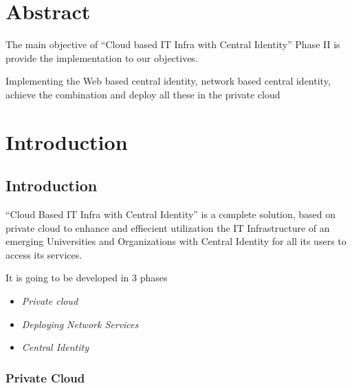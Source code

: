 \documentclass[12pt]{report}
\begin{document}
 
\chapter*{Abstract}
\setcounter{page}{1}
\normalsize
\hspace{0.5cm} The main objective of ``Cloud based IT Infra with Central Identity'' Phase II is provide the implementation to our objectives. \newline

Implementing the Web based central identity, network based central identity, achieve the combination and deploy all these in the private cloud \newline


\setcounter{page}{2}
\tableofcontents
\listoffigures
\pagebreak \thispagestyle{empty} \pagebreak

 
\setcounter{page}{1}


\chapter{Introduction}

\section{Introduction}
	``Cloud Based IT Infra with Central Identity'' is a complete solution, based on private cloud to enhance and effiecient utilization the IT Infrastructure of an emerging Universities and Organizations with Central Identity for all its users to access its services.\newline

	It is going to be developed in 3 phases 
	\begin{itemize}
		\item \textit{Private cloud} 
		\item \textit{Deploying Network Services} 
		\item \textit{Central Identity}
	\end{itemize}
	
\subsection{Private Cloud}
\end{document}
